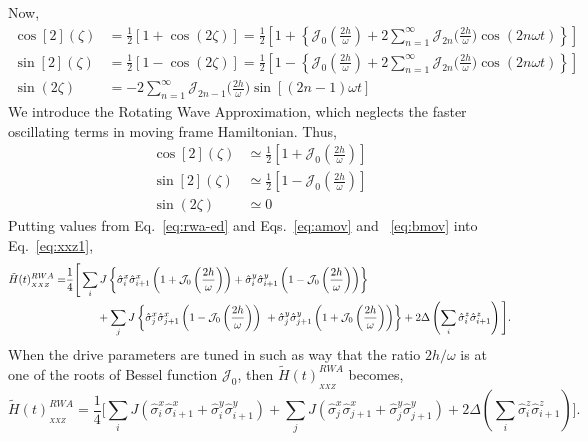 \documentclass[aps,prb,reprint,showpacs,floatfix,superscriptaddress, onecolumn, nofootinbib, 9pt]{revtex4-2}
\begin{document}
\begin{enumerate}
{Now,
\begin{align}
	\cos[2](\zeta) &=\frac12\left[1+\cos(2\zeta)\right]=\frac12\left[1+\left\{\mathcal{J}_0\left(\frac{2h}{\omega}\right) + 2 \sum_{n=1}^\infty \mathcal{J}_{2n}\Big(\frac{2h}{\omega}\Big)\cos(2n\omega t)\right\}\right]\\
	\sin[2](\zeta) &=\frac12\left[1-\cos(2\zeta)\right]=\frac12\left[1-\left\{\mathcal{J}_0\left(\frac{2h}{\omega}\right) + 2 \sum_{n=1}^\infty \mathcal{J}_{2n}\Big(\frac{2h}{\omega}\Big)\cos(2n\omega t)\right\}\right]\\
	\sin(2\zeta) &= -2 \sum_{n=1}^\infty \mathcal{J}_{2n-1}\Big(\frac{2h}{\omega}\Big)\sin[(2n-1)\omega t]
\end{align}
We introduce the Rotating Wave Approximation, which neglects the faster oscillating terms in moving frame Hamiltonian. Thus,
\begin{align}
	\cos[2](\zeta) &\simeq\frac12\left[1+\mathcal{J}_0\left(\frac{2h}{\omega}\right)\right]\nonumber\\
	\sin[2](\zeta) &\simeq\frac12\left[1-\mathcal{J}_0\left(\frac{2h}{\omega}\right)\right]\nonumber\\
	\sin(2\zeta) &\simeq 0	
	\label{eq:rwa-ed}
\end{align}
Putting values from Eq.~\eqref{eq:rwa-ed} and Eqs.~\eqref{eq:amov} and ~\eqref{eq:bmov} into Eq.~\eqref{eq:xxz1},
\begin{align}
	\tilde{H}(t)^{RWA}_{_{XXZ}}= & \frac14\Bigg[\sum_i J\left\{ \hat{\sigma}^x_i \hat{\sigma}^x_{i+1}\left(1+ \mathcal{J}_0\left(\frac{2h}{\omega}\right)\right) + \hat{\sigma}^y_i \hat{\sigma}^y_{i+1} \left(1- \mathcal{J}_0\left(\frac{2h}{\omega}\right)\right)\right\}\nonumber\\
	& \hskip1cm + \sum_j J\left\{ \hat{\sigma}^x_j \hat{\sigma}^x_{j+1}\left(1- \mathcal{J}_0\left(\frac{2h}{\omega}\right)\right)\ + \hat{\sigma}^y_j \hat{\sigma}^y_{j+1} \left(1+ \mathcal{J}_0\left(\frac{2h}{\omega}\right)\right)\right\} + 2\Delta \left(\sum_{i}  \hat{\sigma}_{i}^{z} \hat{\sigma}_{i+1}^{z}\right)\Bigg].
	\label{eq:rwa3}
\end{align}
When the drive parameters are tuned in such as way that the ratio $2h/\omega$ is at one of the roots of Bessel function $\mathcal{J}_0$, then $\tilde{H}(t)^{RWA}_{_{XXZ}}$ becomes,
\begin{equation}
	\tilde{H}(t)^{RWA}_{_{XXZ}}= \frac14\Bigg[\sum_i J\left( \hat{\sigma}^x_i \hat{\sigma}^x_{i+1} + \hat{\sigma}^y_i \hat{\sigma}^y_{i+1} \right) + \sum_j J\left( \hat{\sigma}^x_j \hat{\sigma}^x_{j+1} + \hat{\sigma}^y_j \hat{\sigma}^y_{j+1}\right)+ 2\Delta \left(\sum_{i}  \hat{\sigma}_{i}^{z} \hat{\sigma}_{i+1}^{z}\right)\Bigg].

\end{equation}}
\end{enumerate}
\end{document}
